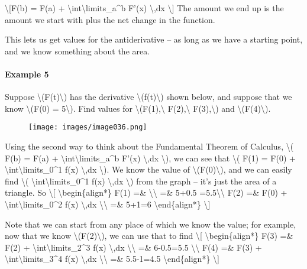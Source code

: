 \textbackslash{}{[}F(b) = F(a) +
\textbackslash{}int\textbackslash{}limits\_a\^{}b F'(x)
\textbackslash{},dx \textbackslash{}{]} The amount we end up is the
amount we start with plus the net change in the function.

This lets us get values for the antiderivative -- as long as we have a
starting point, and we know something about the area.

\hypertarget{example-5}{%
\paragraph{Example 5}\label{example-5}}

Suppose \textbackslash{}(F(t)\textbackslash{}) has the derivative
\textbackslash{}(f(t)\textbackslash{}) shown below, and suppose that we
know \textbackslash{}(F(0) = 5\textbackslash{}). Find values for
\textbackslash{}(F(1),\textbackslash{} F(2),\textbackslash{}
F(3),\textbackslash{}) and \textbackslash{}(F(4)\textbackslash{}).

\begin{figure}
\centering
\texttt{[image: images/image036.png]}
\caption{}
\end{figure}

Using the second way to think about the Fundamental Theorem of Calculus,
\textbackslash{}( F(b) = F(a) +
\textbackslash{}int\textbackslash{}limits\_a\^{}b F'(x)
\textbackslash{},dx \textbackslash{}), we can see that \textbackslash{}(
F(1) = F(0) + \textbackslash{}int\textbackslash{}limits\_0\^{}1 f(x)
\textbackslash{},dx \textbackslash{}). We know the value of
\textbackslash{}(F(0)\textbackslash{}), and we can easily find
\textbackslash{}( \textbackslash{}int\textbackslash{}limits\_0\^{}1 f(x)
\textbackslash{},dx \textbackslash{}) from the graph -- it's just the
area of a triangle. So \textbackslash{}{[}
\textbackslash{}begin\{align*\} F(1) =\&
\textbackslash{}\textbackslash{} =\& 5+0.5
=5.5\textbackslash{}\textbackslash{} F(2) =\& F(0) +
\textbackslash{}int\textbackslash{}limits\_0\^{}2 f(x)
\textbackslash{},dx \textbackslash{}\textbackslash{} =\& 5+1=6
\textbackslash{}end\{align*\} \textbackslash{}{]}

Note that we can start from any place of which we know the value; for
example, now that we know \textbackslash{}(F(2)\textbackslash{}), we can
use that to find \textbackslash{}{[} \textbackslash{}begin\{align*\}
F(3) =\& F(2) + \textbackslash{}int\textbackslash{}limits\_2\^{}3 f(x)
\textbackslash{},dx \textbackslash{}\textbackslash{} =\& 6-0.5=5.5
\textbackslash{}\textbackslash{} F(4) =\& F(3) +
\textbackslash{}int\textbackslash{}limits\_3\^{}4 f(x)
\textbackslash{},dx \textbackslash{}\textbackslash{} =\& 5.5-1=4.5
\textbackslash{}end\{align*\} \textbackslash{}{]}

